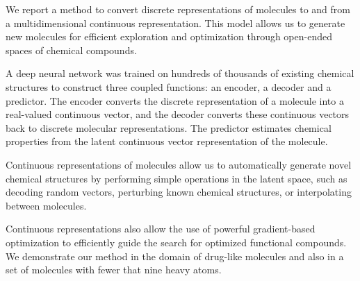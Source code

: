 We report a method to convert discrete representations of molecules to and from a multidimensional continuous representation.
This model allows us to generate new molecules for efficient exploration and optimization through open-ended spaces of chemical compounds.

A deep neural network was trained on hundreds of thousands of existing chemical structures to construct three coupled functions: an encoder, a decoder and a predictor. The encoder converts the discrete representation of a molecule into a real-valued continuous vector, and the decoder converts these continuous vectors back to discrete molecular representations. The predictor estimates chemical properties from the latent continuous vector representation of the molecule.

Continuous representations of molecules allow us to automatically generate novel chemical structures by performing simple operations in the latent space, such as decoding random vectors, perturbing known chemical structures, or interpolating between molecules.

Continuous representations also allow the use of powerful gradient-based optimization to efficiently guide the search for optimized functional compounds.
We demonstrate our method in the domain of drug-like molecules and also in a set of molecules with fewer that nine heavy atoms.

